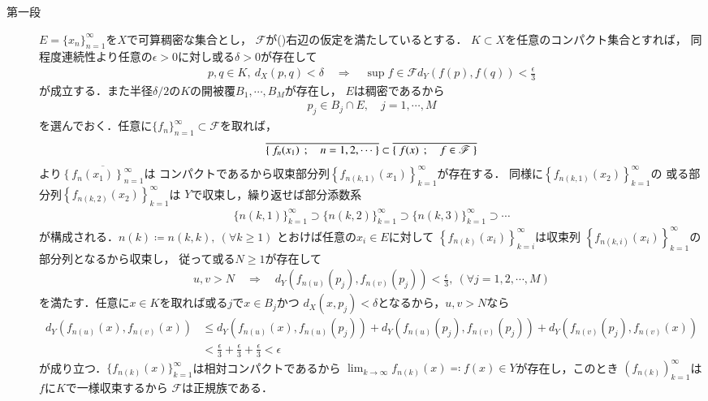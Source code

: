	\begin{prf}\mbox{}
		\begin{description}
			\item[第一段]
				$E = \{x_n\}_{n=1}^\infty$を$X$で可算稠密な集合とし，
				$\mathscr{F}$が()右辺の仮定を満たしているとする．
				$K \subset X$を任意のコンパクト集合とすれば，
				同程度連続性より任意の$\epsilon > 0$に対し或る$\delta > 0$が存在して
				\begin{align}
					p,q \in K,\ d_X(p,q) < \delta \quad \Longrightarrow \quad
					\sup{f \in \mathscr{F}}{d_Y(f(p),f(q))} < \frac{\epsilon}{3}
				\end{align}
				が成立する．また半径$\delta/2$の$K$の開被覆$B_1,\cdots,B_M$が存在し，
				$E$は稠密であるから
				\begin{align}
					p_j \in B_j \cap E, \quad j=1,\cdots,M
				\end{align}
				を選んでおく．任意に$\{f_n\}_{n=1}^\infty \subset \mathscr{F}$を取れば，
				\begin{align}
					\overline{\left\{\ f_n(x_1)\ \, ; \quad n=1,2,\cdots\ \right\}}
					\subset \overline{\left\{\ f(x)\ \, ; \quad f \in \mathscr{F}\ \right\}}
				\end{align}
				より$\overline{\left\{f_{n}(x_1)\right\}_{n=1}^\infty}$は
				コンパクトであるから収束部分列$\left\{f_{n(k,1)}(x_1)\right\}_{k=1}^\infty$が存在する．
				同様に$\left\{f_{n(k,1)}(x_2)\right\}_{k=1}^\infty$の
				或る部分列$\left\{f_{n(k,2)}(x_2)\right\}_{k=1}^\infty$は
				$Y$で収束し，繰り返せば部分添数系
				\begin{align}
					\{n(k,1)\}_{k=1}^\infty \supset
					\{n(k,2)\}_{k=1}^\infty \supset
					\{n(k,3)\}_{k=1}^\infty \supset
					\cdots
				\end{align}
				が構成される．$n(k) \coloneqq n(k,k),\ (\forall k \geq 1)$
				とおけば任意の$x_i \in E$に対して
				$\left\{f_{n(k)}(x_i)\right\}_{k=i}^\infty$は収束列
				$\left\{f_{n(k,i)}(x_i)\right\}_{k=1}^\infty$の部分列となるから収束し，
				従って或る$N \geq 1$が存在して
				\begin{align}
					u,v > N \quad \Longrightarrow \quad
					d_Y\left(f_{n(u)}(p_j),f_{n(v)}(p_j)\right) < \frac{\epsilon}{3},
					\ (\forall j=1,2,\cdots,M)
				\end{align}
				を満たす．任意に$x \in K$を取れば或る$j$で$x \in B_j$かつ
				$d_X(x,p_j) < \delta$となるから，$u,v > N$なら
				\begin{align}
					d_Y(f_{n(u)}(x),f_{n(v)}(x)) 
					&\leq d_Y\left(f_{n(u)}(x),f_{n(u)}(p_j)\right) 
					+ d_Y\left(f_{n(u)}(p_j),f_{n(v)}(p_j)\right)
					+ d_Y\left(f_{n(v)}(p_j),f_{n(v)}(x)\right) \\
					&< \frac{\epsilon}{3} + \frac{\epsilon}{3} + \frac{\epsilon}{3} < \epsilon
				\end{align}
				が成り立つ．$\{f_{n(k)}(x)\}_{k=1}^\infty$は相対コンパクトであるから
				$\lim_{k \to \infty} f_{n(k)}(x) \eqqcolon f(x) \in Y$が存在し，このとき
				$\left(f_{n(k)}\right)_{k=1}^\infty$は$f$に$K$で一様収束するから
				$\mathscr{F}$は正規族である．
			

\end{description}
\end{prf}
